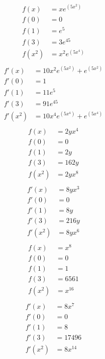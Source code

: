 \begin{align*}
f(x) &= x{{e}^{\left(5{{x}^{2}}\right)}}\\
f(0) &= 0\\ 
f(1) &= {{e}^{5}}\\ 
f(3) &= 3{{e}^{45}}\\ 
f(x^2) &= {{x}^{2}}{{e}^{\left(5{{x}^{4}}\right)}}\\
\end{align*}
\begin{align*}
f'(x) &= 10{{x}^{2}}{{e}^{\left(5{{x}^{2}}\right)}}+{{e}^{\left(5{{x}^{2}}\right)}}\\
f'(0) &= 1\\ 
f'(1) &= 11{{e}^{5}}\\
f'(3) &= 91{{e}^{45}}\\ 
f'(x^2) &= 10{{x}^{4}}{{e}^{\left(5{{x}^{4}}\right)}}+{{e}^{\left(5{{x}^{4}}\right)}}\\
\end{align*}
\begin{align*}
f(x) &= 2y{{x}^{4}}\\
f(0) &= 0\\ 
f(1) &= 2y\\ 
f(3) &= 162y\\ 
f(x^2) &= 2y{{x}^{8}}\\
\end{align*}
\begin{align*}
f'(x) &= 8y{{x}^{3}}\\
f'(0) &= 0\\ 
f'(1) &= 8y\\
f'(3) &= 216y\\ 
f'(x^2) &= 8y{{x}^{6}}\\
\end{align*}
\begin{align*}
f(x) &= {{x}^{8}}\\
f(0) &= 0\\ 
f(1) &= 1\\ 
f(3) &= 6561\\ 
f(x^2) &= {{x}^{16}}\\
\end{align*}
\begin{align*}
f'(x) &= 8{{x}^{7}}\\
f'(0) &= 0\\ 
f'(1) &= 8\\
f'(3) &= 17496\\ 
f'(x^2) &= 8{{x}^{14}}\\
\end{align*}
